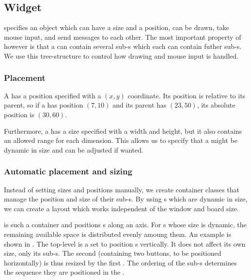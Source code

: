 
\subsection{Widget}
\label{sec:widget}

 specifies an object which can have a size and a position, can be
drawn, take mouse input, and send messages to each other. The most important
property of  however is that a  can contain
several sub-s which each can contain futher sub-s. We use this tree-structure to control how drawing and mouse input is handled.

\subsubsection{Placement}

A  has a position specified with a $(x, y)$ coordinate. Its
position is relative to its parent, so if a  has position
$(7, 10)$ and its parent has $(23, 50)$, its absolute position is $(30, 60)$.

Furthermore, a  has a size specified with a width and height,
but it also contains an allowed range for each dimension. This allows us to
specify that a  might be dynamic in size and can be adjusted if
wanted.

\subsubsection{Automatic placement and sizing}

Instead of setting sizes and positions manually, we create container classes
that manage the position and size of their sub-s. By using
s which are dynamic in size, we can create a layout which works
independent of the window and board size.

 is such a container  and positions
s along an axis. For s whose size is dynamic,
the remaining available space is distributed evenly amoung them. An example is
shown in . The top-level  is a
 set to position s vertically. It does
not affect its own size, only its sub-s. The second
 (containing two buttons, to be positioned
horizontally) is thus resized by the first . The
ordering of the sub-s determines the sequence they are
positioned in the .

